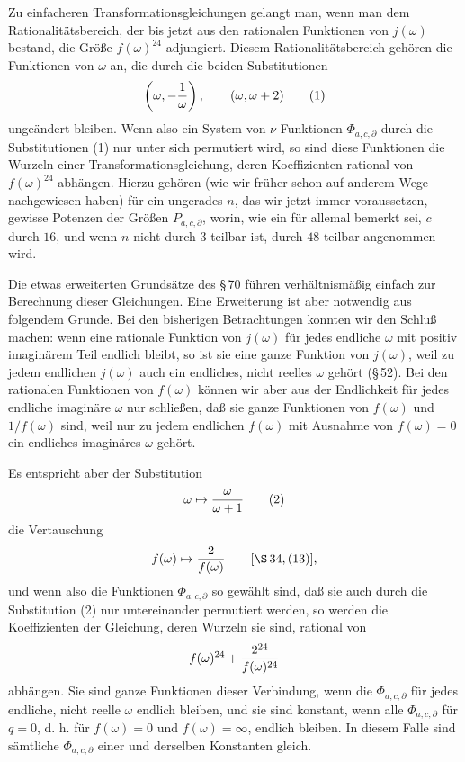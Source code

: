 \documentclass[11pt]{article}
\begin{document}
Zu einfacheren Transformationsgleichungen gelangt man, wenn man dem Rationalitätsbereich, der bis jetzt aus den rationalen Funktionen von $j(\omega)$ bestand, die Größe $f(\omega)^{24}$ adjungiert. Diesem Rationalitätsbereich gehören die Funktionen von $\omega$ an, die durch die beiden Substitutionen
\begin{equation}
 \left(\omega,-{1\over\omega}\right),
 \qquad
 (\omega,\omega+2)
\tag{1}
\end{equation}
ungeändert bleiben. Wenn also ein System von $\nu$ Funktionen $\Phi_{a,c,\partial}$ durch die Substitutionen (1) nur unter sich permutiert wird, so sind diese Funktionen die Wurzeln einer Transformationsgleichung, deren Koeffizienten rational von $f(\omega)^{24}$ abhängen. Hierzu gehören (wie wir früher schon auf anderem Wege nachgewiesen haben) für ein ungerades $n$, das wir jetzt immer voraussetzen, gewisse Potenzen der Größen $P_{a,c,\partial}$, worin, wie ein für allemal bemerkt sei, $c$ durch $16$, und wenn $n$ nicht durch $3$ teilbar ist, durch $48$ teilbar angenommen wird.

Die etwas erweiterten Grundsätze des \S\,70 führen verhältnismäßig einfach zur Berechnung dieser Gleichungen. Eine Erweiterung ist aber notwendig aus folgendem Grunde. Bei den bisherigen Betrachtungen konnten wir den Schluß machen: wenn eine rationale Funktion von $j(\omega)$ für jedes endliche $\omega$ mit positiv imaginärem Teil endlich bleibt, so ist sie eine ganze Funktion von $j(\omega)$, weil zu jedem endlichen $j(\omega)$ auch ein endliches, nicht reelles $\omega$ gehört (\S\,52). Bei den rationalen Funktionen von $f(\omega)$ können wir aber aus der Endlichkeit für jedes endliche imaginäre $\omega$ nur schließen, daß sie ganze Funktionen von $f(\omega)$ und $1/f(\omega)$ sind, weil nur zu jedem endlichen $f(\omega)$ mit Ausnahme von $f(\omega)=0$ ein endliches imaginäres $\omega$ gehört.

Es entspricht aber der Substitution
\begin{equation}
 \omega\mapsto {\omega\over\omega+1}
\tag{2}
\end{equation}
die Vertauschung
\[
 f(\omega)\mapsto {2\over f(\omega)}\qquad[\S\,34,(13)],
\]
und wenn also die Funktionen $\Phi_{a,c,\partial}$ so gewählt sind, daß sie auch durch die Substitution (2) nur untereinander permutiert werden, so werden die Koeffizienten der Gleichung, deren Wurzeln sie sind, rational von
\[
 f(\omega)^{24}+{2^{24}\over f(\omega)^{24}}
\]
abhängen. Sie sind ganze Funktionen dieser Verbindung, wenn die $\Phi_{a,c,\partial}$ für jedes endliche, nicht reelle $\omega$ endlich bleiben, und sie sind konstant, wenn alle $\Phi_{a,c,\partial}$ für $q=0$, d. h. für $f(\omega)=0$ und $f(\omega)=\infty$, endlich bleiben. In diesem Falle sind sämtliche $\Phi_{a,c,\partial}$ einer und derselben Konstanten gleich.
\end{document}

